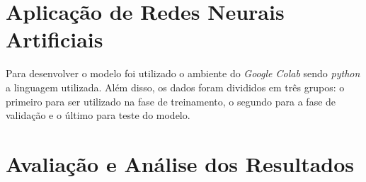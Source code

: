 

\section{Aplicação de Redes Neurais Artificiais}
    Para desenvolver o modelo foi utilizado o ambiente do \emph{Google Colab} sendo \emph{python} a linguagem
    utilizada. Além disso, os dados foram divididos em três grupos: o primeiro para ser utilizado na fase de 
    treinamento, o segundo para a fase de validação e o último para teste do modelo.

\section{Avaliação e Análise dos Resultados}